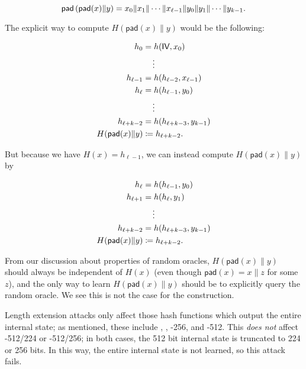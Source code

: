 \begin{equation}
    \textsf{pad}\left( \textsf{pad}(x)\|y \right) = 
        x_{0}\|x_{1}\|\cdots\|x_{\ell-1}\|y_{0}\|y_{1}\|\cdots\|y_{k-1}.
\end{equation}

The explicit way to compute $H(\textsf{pad}(x)\|y)$ would be
the following:

\begin{align}
    h_{0} &= h(\textsf{IV}, x_{0}) \nonumber\\
        &\quad \vdots \nonumber\\
    h_{\ell-1} &= h(h_{\ell-2}, x_{\ell-1}) \nonumber\\
    h_{\ell} &= h(h_{\ell-1}, y_{0}) \nonumber\\
        &\quad \vdots \nonumber\\
    h_{\ell+k-2} &= h(h_{\ell+k-3}, y_{k-1}) \nonumber\\
    H(\textsf{pad}(x)\|y) &\coloneqq{} h_{\ell+k-2}.
\end{align}

\noindent
But because we have $H(x) = h_{\ell-1}$, we can instead compute
$H(\textsf{pad}(x)\|y)$ by

\begin{align}
    h_{\ell} &= h(h_{\ell-1}, y_{0}) \nonumber\\
    h_{\ell+1} &= h(h_{\ell}, y_{1}) \nonumber\\
        &\quad \vdots \nonumber\\
    h_{\ell+k-2} &= h(h_{\ell+k-3}, y_{k-1}) \nonumber\\
    H(\textsf{pad}(x)\|y) &\coloneqq{} h_{\ell+k-2}.
\end{align}

\noindent
From our discussion about properties of \glspl{random oracle},
$H(\textsf{pad}(x)\|y)$ should always be independent of $H(x)$
(even though $\textsf{pad}(x) = x\|z$ for some $z$),
and the only way to learn $H(\textsf{pad}(x)\|y)$ should be to explicitly
query the \gls{random oracle}.
We see this is not the case for the \MD{} construction.

Length extension attacks only affect those \glspl{hash function} which output
the entire internal state;
as mentioned, these include \MDFive{}, \ShaOne{}, \ShaTwo{}-256,
and \ShaTwo{}-512.
This \emph{does not} affect \ShaTwo{}-512/224 or \ShaTwo{}-512/256;
in both cases, the 512 bit internal state is truncated
to 224 or 256 bits.
In this way, the entire internal state is not learned,
so this attack fails.


